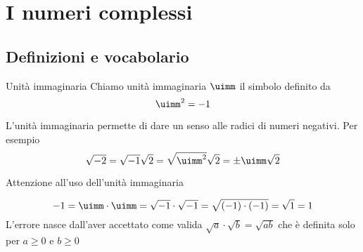 \chapter{I numeri complessi}
\label{cha:INumeriComplessi}
\section{Definizioni e vocabolario}
\label{sec:NumCompDefinizioniVocabolario}
\begin{definizionet}{Unità immaginaria}{}
	Chiamo unità immaginaria $\uimm$ il simbolo definito da \[\uimm^2=-1\]  
\end{definizionet}
L'unità immaginaria permette di dare un senso alle radici di numeri negativi. Per esempio \[\sqrt{-2}=\sqrt{-1}\sqrt{2}=\sqrt{\uimm^2}\sqrt{2}=\pm\uimm\sqrt{2}\]
\begin{attenzionet}{}{}
Attenzione all'uso dell'unità immaginaria
\end{attenzionet}
\[-1=\uimm\cdot\uimm=\sqrt{-1}\cdot\sqrt{-1}=\sqrt{(-1)\cdot(-1)}=\sqrt{1}=1 \]L'errore nasce dall'aver accettato come valida $\sqrt{a}\cdot\sqrt{b}=\sqrt{ab}$ che è definita solo per $a\geq 0$ e $b\geq 0$

